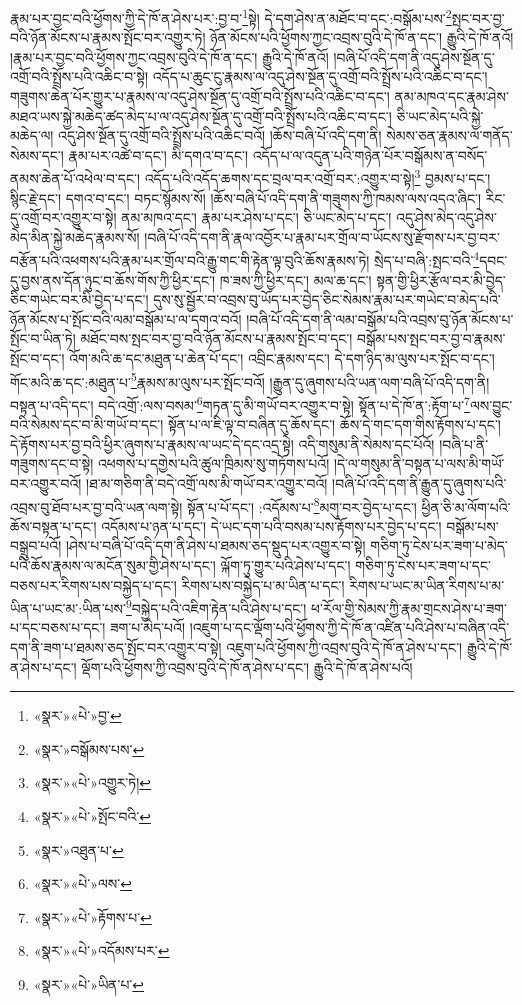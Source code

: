རྣམ་པར་བྱང་བའི་ཕྱོགས་ཀྱི་དེ་ཁོ་ན་ཤེས་པར་:བྱ་བ་\footnote{«སྣར་»«པེ་»བྱ་}སྟེ། དེ་དག་ཤེས་ན་མཐོང་བ་དང་:བསྒོམ་པས་\footnote{«སྣར་»བསྒོམས་པས་}སྤང་བར་བྱ་བའི་ཉོན་མོངས་པ་རྣམས་སྤོང་བར་འགྱུར་ཏེ། ཉོན་མོངས་པའི་ཕྱོགས་ཀྱང་འབྲས་བུའི་དེ་ཁོ་ན་དང་། རྒྱུའི་དེ་ཁོ་ནའོ། །རྣམ་པར་བྱང་བའི་ཕྱོགས་ཀྱང་འབྲས་བུའི་དེ་ཁོ་ན་དང་། རྒྱུའི་དེ་ཁོ་ནའོ། །བཞི་པོ་འདི་དག་ནི་འདུ་ཤེས་སྔོན་དུ་འགྲོ་བའི་སྤྲོས་པའི་འཆིང་བ་སྟེ། འདོད་པ་ཆུང་ངུ་རྣམས་ལ་འདུ་ཤེས་སྔོན་དུ་འགྲོ་བའི་སྤྲོས་པའི་འཆིང་བ་དང་། གཟུགས་ཆེན་པོར་གྱུར་པ་རྣམས་ལ་འདུ་ཤེས་སྔོན་དུ་འགྲོ་བའི་སྤྲོས་པའི་འཆིང་བ་དང་། ནམ་མཁའ་དང་རྣམ་ཤེས་མཐའ་ཡས་སྐྱེ་མཆེད་ཚད་མེད་པ་ལ་འདུ་ཤེས་སྔོན་དུ་འགྲོ་བའི་སྤྲོས་པའི་འཆིང་བ་དང་། ཅི་ཡང་མེད་པའི་སྐྱེ་མཆེད་ལ། འདུ་ཤེས་སྔོན་དུ་འགྲོ་བའི་སྤྲོས་པའི་འཆིང་བའོ། །ཆོས་བཞི་པོ་འདི་དག་ནི། སེམས་ཅན་རྣམས་ལ་གནོད་སེམས་དང་། རྣམ་པར་འཚེ་བ་དང་། མི་དགའ་བ་དང་། འདོད་པ་ལ་འདུན་པའི་གཉེན་པོར་བསྒོམས་ན་བསོད་ནམས་ཆེན་པོ་འཕེལ་བ་དང་། འདོད་པའི་འདོད་ཆགས་དང་བྲལ་བར་འགྲོ་བར་:འགྱུར་བ་སྟེ།\footnote{«སྣར་»«པེ་»འགྱུར་ཏེ།} བྱམས་པ་དང་། སྙིང་རྗེ་དང་། དགའ་བ་དང་། བཏང་སྙོམས་སོ། །ཆོས་བཞི་པོ་འདི་དག་ནི་གཟུགས་ཀྱི་ཁམས་ལས་འདའ་ཞིང་། རིང་དུ་འགྲོ་བར་འགྱུར་བ་སྟེ། ནམ་མཁའ་དང་། རྣམ་པར་ཤེས་པ་དང་། ཅི་ཡང་མེད་པ་དང་། འདུ་ཤེས་མེད་འདུ་ཤེས་མེད་མིན་སྐྱེ་མཆེད་རྣམས་སོ། །བཞི་པོ་འདི་དག་ནི་རྣལ་འབྱོར་པ་རྣམ་པར་གྲོལ་བ་ཡོངས་སུ་རྫོགས་པར་བྱ་བར་བརྩོན་པའི་འཕགས་པའི་རྣམ་པར་གྲོལ་བའི་རྒྱུ་གང་གི་རྟེན་ལྟ་བུའི་ཆོས་རྣམས་ཏེ། སྲེད་པ་བཞི་:སྤང་བའི་\footnote{«སྣར་»«པེ་»སྤོང་བའི་}དབང་དུ་བྱས་ནས་དོན་ཉུང་བ་ཆོས་གོས་ཀྱི་ཕྱིར་དང་། ཁ་ཟས་ཀྱི་ཕྱིར་དང་། མལ་ཆ་དང་། སྟན་གྱི་ཕྱིར་རྩོལ་བར་མི་བྱེད་ཅིང་གཡེང་བར་མི་བྱེད་པ་དང་། དུས་སུ་སྦྱོར་བ་འབྲས་བུ་ཡོད་པར་བྱེད་ཅིང་སེམས་རྣམ་པར་གཡེང་བ་མེད་པའི་ཉོན་མོངས་པ་སྤོང་བའི་ལམ་བསྒོམ་པ་ལ་དགའ་བའོ། །བཞི་པོ་འདི་དག་ནི་ལམ་བསྒོམ་པའི་འབྲས་བུ་ཉོན་མོངས་པ་སྤོང་བ་ཡིན་ཏེ། མཐོང་བས་སྤང་བར་བྱ་བའི་ཉོན་མོངས་པ་རྣམས་སྤོང་བ་དང་། བསྒོམ་པས་སྤང་བར་བྱ་བ་རྣམས་སྤོང་བ་དང་། འོག་མའི་ཆ་དང་མཐུན་པ་ཆེན་པོ་དང་། འབྲིང་རྣམས་དང་། དེ་དག་ཉིད་མ་ལུས་པར་སྤོང་བ་དང་། གོང་མའི་ཆ་དང་:མཐུན་པ་\footnote{«སྣར་»འཐུན་པ་}རྣམས་མ་ལུས་པར་སྤོང་བའོ། །རྒྱུན་དུ་ཞུགས་པའི་ཡན་ལག་བཞི་པོ་འདི་དག་ནི། བསྟན་པ་འདི་དང་། བདེ་འགྲོ་:ལས་བསམ་\footnote{«སྣར་»«པེ་»ལས་}གཏན་དུ་མི་གཡོ་བར་འགྱུར་བ་སྟེ། སྟོན་པ་དེ་ཁོ་ན་:རྟོག་པ་\footnote{«སྣར་»«པེ་»རྟོགས་པ་}ལས་བྱུང་བའི་སེམས་དང་བ་མི་གཡོ་བ་དང་། སྟོན་པ་ལ་ཇི་ལྟ་བ་བཞིན་དུ་ཆོས་དང་། ཆོས་དེ་གང་དག་གིས་རྟོགས་པ་དང་། དེ་རྟོགས་པར་བྱ་བའི་ཕྱིར་ཞུགས་པ་རྣམས་ལ་ཡང་དེ་དང་འདྲ་སྟེ། འདི་གསུམ་ནི་སེམས་དང་པོའོ། །བཞི་པ་ནི་གཟུགས་དང་བ་སྟེ། འཕགས་པ་དགྱེས་པའི་ཚུལ་ཁྲིམས་སུ་གཏོགས་པའོ། །དེ་ལ་གསུམ་ནི་བསྟན་པ་ལས་མི་གཡོ་བར་འགྱུར་བའོ། །ཐ་མ་གཅིག་ནི་བདེ་འགྲོ་ལས་མི་གཡོ་བར་འགྱུར་བའོ། །བཞི་པོ་འདི་དག་ནི་རྒྱུན་དུ་ཞུགས་པའི་འབྲས་བུ་ཐོབ་པར་བྱ་བའི་ཡན་ལག་སྟེ། སྟོན་པ་པོ་དང་། :འདོམས་པ་\footnote{«སྣར་»«པེ་»འདོམས་པར་}མགུ་བར་བྱེད་པ་དང་། ཕྱིན་ཅི་མ་ལོག་པའི་ཆོས་བསྟན་པ་དང་། འདོམས་པ་ཉན་པ་དང་། དེ་ཡང་དག་པའི་བསམ་པས་རྟོགས་པར་བྱེད་པ་དང་། བསྒོམ་པས་བསྒྲུབ་པའོ། །ཤེས་པ་བཞི་པོ་འདི་དག་ནི་ཤེས་པ་ཐམས་ཅད་སྡུད་པར་འགྱུར་བ་སྟེ། གཅིག་ཏུ་ངེས་པར་ཟག་པ་མེད་པའི་ཆོས་རྣམས་ལ་མངོན་སུམ་གྱི་ཤེས་པ་དང་། ལྐོག་ཏུ་གྱུར་པའི་ཤེས་པ་དང་། གཅིག་ཏུ་ངེས་པར་ཟག་པ་དང་བཅས་པར་རིགས་པས་བསྐྱེད་པ་དང་། རིགས་པས་བསྐྱེད་པ་མ་ཡིན་པ་དང་། རིགས་པ་ཡང་མ་ཡིན་རིགས་པ་མ་ཡིན་པ་ཡང་མ་:ཡིན་པས་\footnote{«སྣར་»«པེ་»ཡིན་པ་}བསྐྱེད་པའི་འཇིག་རྟེན་པའི་ཤེས་པ་དང་། ཕ་རོལ་གྱི་སེམས་ཀྱི་རྣམ་གྲངས་ཤེས་པ་ཟག་པ་དང་བཅས་པ་དང་། ཟག་པ་མེད་པའོ། །འཇུག་པ་དང་ལྡོག་པའི་ཕྱོགས་ཀྱི་དེ་ཁོ་ན་འཛིན་པའི་ཤེས་པ་བཞིན་འདི་དག་ནི་ཟག་པ་ཐམས་ཅད་སྤོང་བར་འགྱུར་བ་སྟེ། འཇུག་པའི་ཕྱོགས་ཀྱི་འབྲས་བུའི་དེ་ཁོ་ན་ཤེས་པ་དང་། རྒྱུའི་དེ་ཁོ་ན་ཤེས་པ་དང་། ལྡོག་པའི་ཕྱོགས་ཀྱི་འབྲས་བུའི་དེ་ཁོ་ན་ཤེས་པ་དང་། རྒྱུའི་དེ་ཁོ་ན་ཤེས་པའོ། 